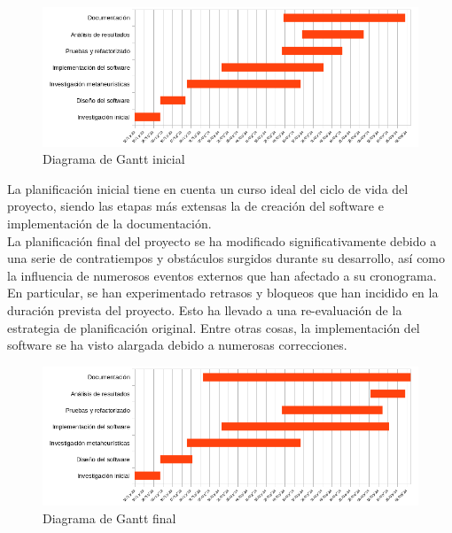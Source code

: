 \begin{figure}[htp]
      \begin{center}
            \includegraphics[width=1\textwidth]{imagenes/gantt-init.png}
      \end{center}
      \caption{Diagrama de Gantt inicial}
\end{figure}

La planificación inicial tiene en cuenta un curso ideal del ciclo de vida del proyecto, siendo las etapas más extensas la de creación del software e implementación de la documentación.\\[6pt]
La planificación final del proyecto se ha modificado significativamente debido a una serie de contratiempos y obstáculos surgidos durante su desarrollo, así como la influencia de numerosos eventos externos que han afectado a su cronograma. En particular, se han experimentado retrasos y bloqueos que han incidido en la duración prevista del proyecto. Esto ha llevado a una re-evaluación de la estrategia de planificación original. Entre otras cosas, la implementación del software se ha visto alargada debido a numerosas correcciones.

\begin{figure}[htp]
      \begin{center}
            \includegraphics[width=1\textwidth]{imagenes/gantt-fin.png}
      \end{center}
      \caption{Diagrama de Gantt final}
\end{figure}

